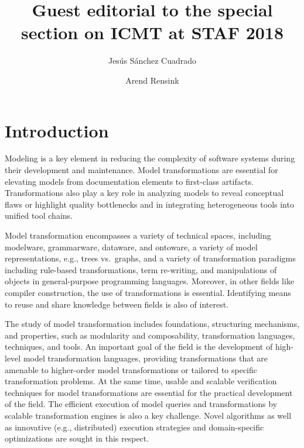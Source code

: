 \documentclass[twocolumn,final]{svjour3}
\begin{document}
\title{Guest editorial to the special section on ICMT at STAF 2018}
\author{Jesús Sánchez Cuadrado \and Arend Rensink}
\maketitle

\section{Introduction}

Modeling is a key element in reducing the complexity of software systems during their development and maintenance. Model transformations are essential for elevating models from documentation elements to first-class artifacts. Transformations also play a key role in analyzing models to reveal conceptual flaws or highlight quality bottlenecks and in integrating heterogeneous tools into unified tool chains.

Model transformation encompasses a variety of technical spaces, including modelware, grammarware, dataware, and ontoware, a variety of model representations, e.g., trees vs.\ graphs, and a variety of transformation paradigms including rule-based transformations, term re-writing, and manipulations of objects in general-purpose programming languages. Moreover, in other fields like compiler construction, the use of transformations is essential. Identifying means to reuse and share knowledge between fields is also of interest.

The study of model transformation includes foundations, structuring mechanisms, and properties, such as modularity and composability, transformation languages, techniques, and tools. An important goal of the field is the development of high-level model transformation languages, providing transformations that are amenable to higher-order model transformations or tailored to specific transformation problems. At the same time, usable and scalable verification techniques for model transformations are essential for the practical development of the field. The efficient execution of model queries and transformations by scalable transformation engines is also a key challenge. Novel algorithms as well as innovative (e.g., distributed) execution strategies and domain-specific optimizations are sought in this respect.
\end{document}
